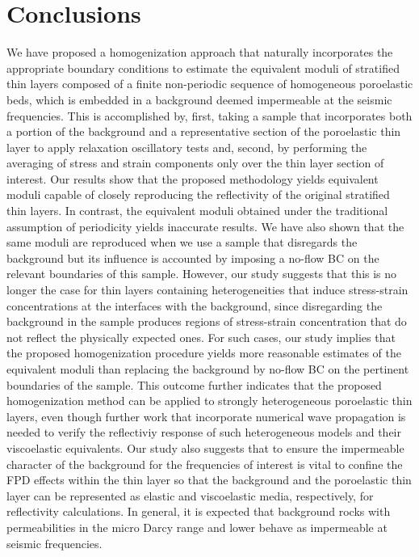 \documentclass[draft]{agujournal2019}
\begin{document}
\section{Conclusions}
We have proposed a homogenization approach that naturally incorporates the appropriate boundary conditions to estimate the equivalent moduli of stratified thin layers composed of a finite non-periodic sequence of homogeneous poroelastic beds, which is embedded in a background deemed impermeable at the seismic frequencies.
This is accomplished by, first, taking a sample that incorporates both a portion of the background and a representative section of the poroelastic thin layer to apply relaxation oscillatory tests and, second, by performing the averaging of stress and strain components only over the thin layer section of interest.
Our results show that the proposed methodology yields equivalent moduli capable of closely reproducing the reflectivity of the original stratified thin layers. In contrast, the equivalent moduli obtained under the traditional assumption of periodicity yields inaccurate results. We  have also shown that the same moduli are reproduced when we use a sample that disregards the background but its influence is accounted by imposing a no-flow BC on the relevant boundaries of this sample. However, our study suggests that this is no longer the case for thin layers containing heterogeneities that induce stress-strain concentrations at the interfaces with the background, since disregarding the background in the sample produces regions of stress-strain concentration that do not reflect the physically expected ones. For such cases, our study implies that the proposed homogenization procedure yields more reasonable estimates of the equivalent moduli than replacing the background by no-flow BC on the pertinent boundaries of the sample. This outcome further indicates that the proposed homogenization method can be applied to strongly heterogeneous poroelastic thin layers, even though further work that incorporate numerical wave propagation is needed to verify the reflectiviy response of such heterogeneous models and their viscoelastic equivalents. Our study also suggests that to ensure the impermeable character
of the background for the frequencies of interest is vital to confine the FPD effects within the thin layer so that the background and the poroelastic thin layer can be represented as elastic and viscoelastic media, respectively, for reflectivity calculations. In general, it is expected that background rocks with permeabilities in the micro Darcy range and lower behave as impermeable at seismic frequencies.
\end{document}
